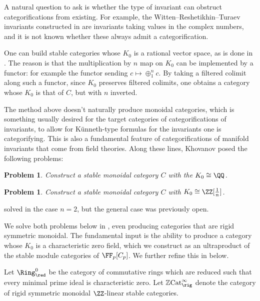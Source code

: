 \documentclass[12pt,oneside]{article}
\newcommand{\ZCat}{\mathbb{Z}\mathrm{Cat}}
\newcounter{counter}
\newtheorem{prb}[counter]{Problem}
\begin{document}
	A natural question to ask is whether the type of invariant can obstruct categorifications from existing.
	For example, the Witten--Reshetikhin--Turaev invariants constructed in \cite{witten1989quantum,reshetikhin1991invariants} are invariants taking values in the complex numbers, and it is not known whether these always admit a categorification. 
	
	One can build stable categories whose $K_0$ is a rational vector space, as is done in \cite{barwick2019categorifying}. The reason is that the multiplication by $n$ map on $K_0$ can be implemented by a functor: for example the functor sending $c \mapsto \oplus_1^nc$. By taking a filtered colimit along such a functor, since $K_0$ preserves filtered colimits, one obtains a category whose $K_0$ is that of $C$, but with $n$ inverted.
	
	The method above doesn't naturally produce monoidal categories, which is something usually desired for the target categories of categorifications of invariants, to allow for K\"unneth-type formulas for the invariants one is categorifying. This is also a fundamental feature of categorifications of manifold invariants that come from field theories. Along these lines, Khovanov posed the following problems:
	
	\begin{prb}{\cite[Problem 2.3]{khovanov2016linearization}}\label{prob1}
		Construct a stable monoidal category $C$ with the $K_0\cong\QQ$.
	\end{prb}

	\begin{prb}\cite[Problem 2.4]{khovanov2016linearization}\label{prob2}
		Construct a stable monoidal category $C$ with $K_0\cong \ZZ[\frac 1 n]$.
	\end{prb}

	\cite{khovanov2019categorify} solved  in the case $n=2$, but the general case was previously open.
	
	We solve both problems below in , even producing categories that are rigid symmetric monoidal. The fundamental input is the ability to produce a category whose $K_0$ is a characteristic zero field, which we construct as an ultraproduct of the stable module categories of $\FF_p[C_p]$. We further refine this in  below. 
	
 	Let $\Ring_{\red}^0$ be the category of commutative rings which are reduced such that every minimal prime ideal is characteristic zero. Let $\ZCat^{\infty}_{\rig}$ denote the category of rigid symmetric monoidal $\ZZ$-linear stable categories.
	
\end{document}
